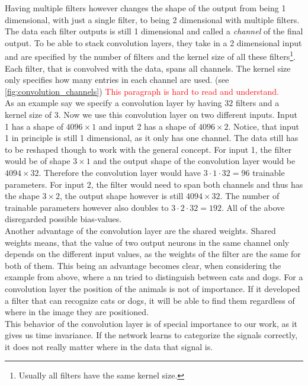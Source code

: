 Having multiple filters however changes the shape of the output from being 1 dimensional, with just a single filter, to being 2 dimensional with multiple filters. The data each filter outputs is still 1 dimensional and called a \emph{channel} of the final output. To be able to stack convolution layers, they take in a 2 dimensional input and are specified by the number of filters and the kernel size of all these filters\footnote{Usually all filters have the same kernel size.}. Each filter, that is convolved with the data, spans all channels. The kernel size only specifies how many entries in each channel are used. (see \autoref{fig:convolution_channels}) \textcolor{red}{This paragraph is hard to read and understand.}\\
As an example say we specify a convolution layer by having $32$ filters and a kernel size of $3$. Now we use this convolution layer on two different inputs. Input 1 has a shape of $4096\times 1$ and input 2 has a shape of $4096\times 2$. Notice, that input 1 in principle is still 1 dimensional, as it only has one channel. The data still has to be reshaped though to work with the general concept. For input 1, the filter would be of shape $3\times 1$ and the output shape of the convolution layer would be $4094\times 32$. Therefore the convolution layer would have $3\cdot 1\cdot 32=96$ trainable parameters. For input 2, the filter would need to span both channels and thus has the shape $3\times 2$, the output shape however is still $4094\times 32$. The number of trainable parameters however also doubles to $3\cdot 2\cdot 32=192$. All of the above disregarded possible bias-values.\medskip\\
Another advantage of the convolution layer are the shared weights. Shared weights means, that the value of two output neurons in the same channel only depends on the different input values, as the weights of the filter are the same for both of them. This being an advantage becomes clear, when considering the example from above, where a \gls{nn} tried to distinguish between cats and dogs. For a convolution layer the position of the animals is not of importance. If it developed a filter that can recognize cats or dogs, it will be able to find them regardless of where in the image they are positioned.\\
This behavior of the convolution layer is of special importance to our work, as it gives us time invariance. If the network learns to categorize the signals correctly, it does not really matter where in the data that signal is.\\
